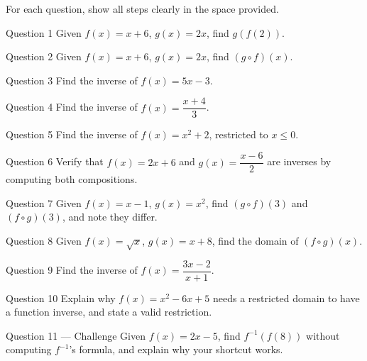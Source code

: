 \documentclass[11pt]{article}
\begin{document}
\clearpage
{}
For each question, show all steps clearly in the space provided.

\begin{qbox}{Question 1}
Given $f(x)=x+6$, $g(x)=2x$, find $g(f(2))$.\workspace{2.4cm}
\end{qbox}

\begin{qbox}{Question 2}
Given $f(x)=x+6$, $g(x)=2x$, find $(g\circ f)(x)$.\workspace{2.4cm}
\end{qbox}

\begin{qbox}{Question 3}
Find the inverse of $f(x)=5x-3$.\workspace{2.4cm}
\end{qbox}

\begin{qbox}{Question 4}
Find the inverse of $f(x)=\dfrac{x+4}{3}$.\workspace{2.4cm}
\end{qbox}

\begin{qbox}{Question 5}
Find the inverse of $f(x)=x^2+2$, restricted to $x\leq0$.\workspace{2.4cm}
\end{qbox}

\begin{qbox}{Question 6}
Verify that $f(x)=2x+6$ and $g(x)=\dfrac{x-6}{2}$ are inverses by computing both compositions.\workspace{2.4cm}
\end{qbox}

\begin{qbox}{Question 7}
Given $f(x)=x-1$, $g(x)=x^2$, find $(g\circ f)(3)$ and $(f\circ g)(3)$, and note they differ.\workspace{2.4cm}
\end{qbox}

\begin{qbox}{Question 8}
Given $f(x)=\sqrt{x}$, $g(x)=x+8$, find the domain of $(f\circ g)(x)$.\workspace{2.4cm}
\end{qbox}

\begin{qbox}{Question 9}
Find the inverse of $f(x)=\dfrac{3x-2}{x+1}$.\workspace{2.4cm}
\end{qbox}

\begin{qbox}{Question 10}
Explain why $f(x)=x^2-6x+5$ needs a restricted domain to have a function inverse, and state a valid restriction.\workspace{2.4cm}
\end{qbox}

\begin{qbox}{Question 11 --- Challenge}
Given $f(x)=2x-5$, find $f^{-1}(f(8))$ without computing $f^{-1}$'s formula, and explain why your shortcut works.\workspace{3cm}
\end{qbox}
\end{document}
